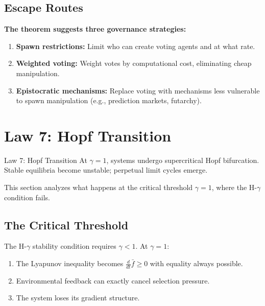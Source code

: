 \documentclass[12pt]{article}
\newcommand{\added}[1]{\textbf{#1}}
\begin{document}
\subsection{Escape Routes}

\added{\textbf{The theorem suggests three governance strategies:}}
\begin{enumerate}
    \item \textbf{Spawn restrictions:} Limit who can create voting agents and at what rate.
    \item \textbf{Weighted voting:} Weight votes by computational cost, eliminating cheap manipulation.
    \item \textbf{Epistocratic mechanisms:} Replace voting with mechanisms less vulnerable to spawn manipulation (e.g., prediction markets, futarchy).
\end{enumerate}




\section{Law 7: Hopf Transition}
\label{sec:law7}

\begin{lawbox}{Law 7: Hopf Transition}
At $\gamma = 1$, systems undergo supercritical Hopf bifurcation. Stable equilibria become unstable; perpetual limit cycles emerge.
\end{lawbox}

This section analyzes what happens at the critical threshold $\gamma = 1$, where the H-$\gamma$ condition fails.

\subsection{The Critical Threshold}

The H-$\gamma$ stability condition requires $\gamma < 1$. At $\gamma = 1$:
\begin{enumerate}
    \item The Lyapunov inequality becomes $\frac{d}{dt}\bar{f} \geq 0$ with equality always possible.
    \item Environmental feedback can exactly cancel selection pressure.
    \item The system loses its gradient structure.
\end{enumerate}
\end{document}
